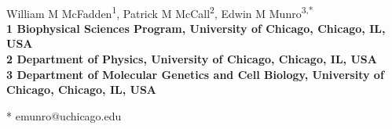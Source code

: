 \documentclass[10pt,letterpaper]{article}
\date{}
\begin{document}
\vspace*{0.35in}

\begin{flushleft}
{\Large
\textbf{}
}
\newline
\\
William M McFadden\textsuperscript{1},
Patrick M McCall\textsuperscript{2},
Edwin M Munro\textsuperscript{3,*}
\\
\bigskip
\bf{1} Biophysical Sciences Program, University of Chicago, Chicago, IL, USA
\\
\bf{2} Department of Physics, University of Chicago, Chicago, IL, USA
\\
\bf{3} Department of Molecular Genetics and Cell Biology, University of Chicago, Chicago, IL, USA
\\
\bigskip

% 
%





* emunro@uchicago.edu

\end{flushleft}
\end{document}
